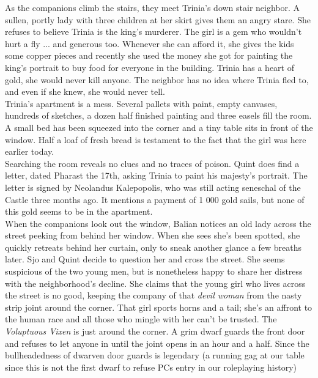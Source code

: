 As the companions climb the stairs, they meet Trinia's down stair neighbor. A sullen, portly lady with three children at her skirt gives them an angry stare. She refuses to believe Trinia is the king's murderer. The girl is a gem who wouldn't hurt a fly ... and generous too. Whenever she can afford it, she gives the kids some copper pieces and recently she used the money she got for painting the king's portrait to buy food for everyone in the building. Trinia has a heart of gold, she would never kill anyone. The neighbor has no idea where Trinia fled to, and even if she knew, she would never tell.\\

Trinia's apartment is a mess. Several pallets with paint, empty canvases, hundreds of sketches, a dozen half finished painting and three easels fill the room. A small bed has been squeezed into the corner and a tiny table sits in front of the window. Half a loaf of fresh bread is testament to the fact that the girl was here earlier today.\\

Searching the room reveals no clues and no traces of poison. Quint does find a letter, dated Pharast the 17th, asking Trinia to paint his majesty's portrait. The letter is signed by Neolandus Kalepopolis, who was still acting seneschal of the Castle three months ago. It mentions a payment of 1 000 gold sails, but none of this gold seems to be in the apartment.\\

When the companions look out the window, Balian notices an old lady across the street peeking from behind her window. When she sees she's been spotted, she quickly retreats behind her curtain, only to sneak another glance a few breaths later. Sjo and Quint decide to question her and cross the street. She seems suspicious of the two young men, but is nonetheless happy to share her distress with the neighborhood's decline. She claims that the young girl who lives across the street is no good, keeping the company of that {\itshape devil woman} from the nasty strip joint around the corner. That girl sports horns and a tail; she's an affront to the human race and all those who mingle with her can't be trusted. The {\itshape Voluptuous Vixen} is just around the corner. A grim dwarf guards the front door and refuses to let anyone in until the joint opens in an hour and a half. Since the bullheadedness of dwarven door guards is legendary (a running gag at our table since this is not the first dwarf to refuse PCs entry in our roleplaying history) 